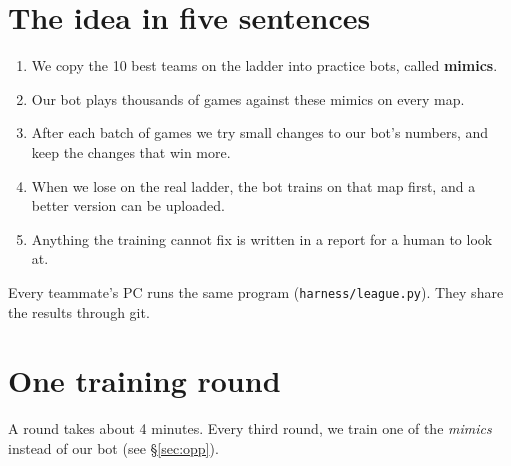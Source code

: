 \documentclass[11pt,a4paper]{article}
\newcommand{\f}[1]{\texttt{#1}}
\begin{document}
\section{The idea in five sentences}
\begin{enumerate}
\item We copy the 10 best teams on the ladder into practice bots, called \textbf{mimics}.
\item Our bot plays thousands of games against these mimics on every map.
\item After each batch of games we try small changes to our bot's numbers, and keep the changes that win more.
\item When we lose on the real ladder, the bot trains on that map first, and a better version can be uploaded.
\item Anything the training cannot fix is written in a report for a human to look at.
\end{enumerate}
Every teammate's PC runs the same program (\f{harness/league.py}). They share the results through git.

\section{One training round}
\begin{center}
\end{center}
A round takes about 4 minutes. Every third round, we train one of the \emph{mimics} instead of our bot
(see \S\ref{sec:opp}).
\end{document}
